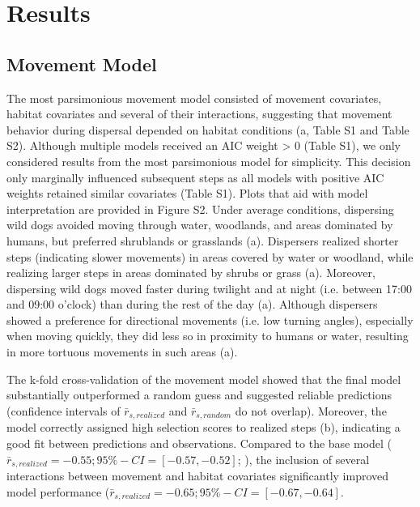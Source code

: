 \documentclass[abstract=on,10pt,a4paper,bibliography=totocnumbered]{article}
\begin{document}
\section{Results}
\subsection{Movement Model}
The most parsimonious movement model consisted of movement covariates, habitat
covariates and several of their interactions, suggesting that movement behavior
during dispersal depended on habitat conditions (a, Table S1
and Table S2). Although multiple models received an AIC weight > 0 (Table S1),
we only considered results from the most parsimonious model for simplicity. This
decision only marginally influenced subsequent steps as all models with positive
AIC weights retained similar covariates (Table S1). Plots that aid with model
interpretation are provided in Figure S2. Under average conditions, dispersing
wild dogs avoided moving through water, woodlands, and areas dominated by
humans, but preferred shrublands or grasslands (a).
Dispersers realized shorter steps (indicating slower movements) in areas covered
by water or woodland, while realizing larger steps in areas dominated by shrubs
or grass (a). Moreover, dispersing wild dogs moved faster
during twilight and at night (i.e. between 17:00 and 09:00 o'clock) than during
the rest of the day (a). Although dispersers showed a
preference for directional movements (i.e. low turning angles), especially when
moving quickly, they did less so in proximity to humans or water, resulting in
more tortuous movements in such areas (a).

The k-fold cross-validation of the movement model showed that the final model
substantially outperformed a random guess and suggested reliable predictions
(confidence intervals of \(\bar{r}_{s, realized}\) and \(\bar{r}_{s, random}\)
do not overlap). Moreover, the model correctly assigned high selection scores to
realized steps (b), indicating a good fit between
predictions and observations. Compared to the base model (\(\bar{r}_{s,
realized} = -0.55; 95\%-CI = [-0.57, -0.52]\); \citealp{Hofmann.2021}), the
inclusion of several interactions between movement and habitat covariates
significantly improved model performance (\(\bar{r}_{s, realized} = -0.65;
95\%-CI = [-0.67, -0.64]\).
\end{document}
